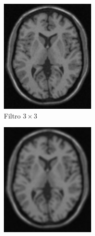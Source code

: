 \documentclass[letterpaper,12pt]{article}
\theoremstyle{plain}
\begin{document}
\begin{figure}[H]
\begin{subfigure}[h]{0.24\linewidth}
            \includegraphics[width=\textwidth]{Figuras/ImagenA3x3.png}
            \caption{\centering Filtro \centering $3\times3$} 
         \end{subfigure}
         \begin{subfigure}[h]{0.24\linewidth}
            \centering
            \includegraphics[width=\textwidth]{Figuras/ImagenA5x5.png}

\end{subfigure}
\end{figure}
\end{document}

